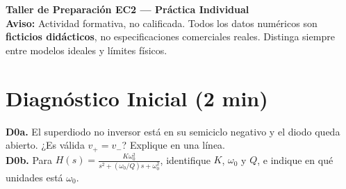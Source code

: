 \documentclass[10pt, a4paper]{article}
\begin{document}
\begin{center}
    {\Large\textbf{\textcolor{ucbblue}{Taller de Preparación EC2 — Práctica Individual}}} \\[0.1cm]
    {\footnotesize\textbf{Aviso:} Actividad formativa, no calificada. Todos los datos numéricos son \textbf{ficticios didácticos}, no especificaciones comerciales reales. Distinga siempre entre modelos ideales y límites físicos.}
\end{center}

\section*{Diagnóstico Inicial (2 min)}
\textbf{D0a.} El superdiodo no inversor está en su semiciclo negativo y el diodo queda abierto. ¿Es válida $v_+ = v_-$? Explique en una línea. \\[0.5cm]
\textbf{D0b.} Para $H(s) = \frac{K\omega_0^2}{s^2 + (\omega_0/Q)s + \omega_0^2}$, identifique $K$, $\omega_0$ y $Q$, e indique en qué unidades está $\omega_0$.
\vspace{0.8cm}
\end{document}
